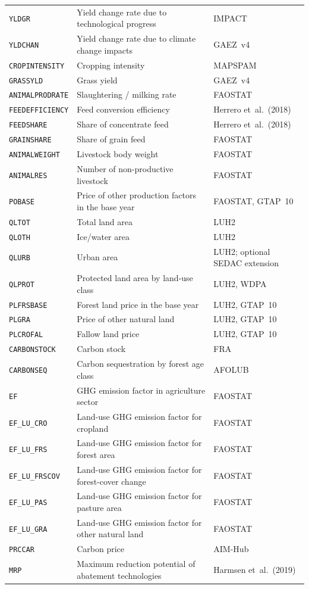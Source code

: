 \begin{xltabular}{\linewidth}{l X l}
  \texttt{YLDGR} & Yield change rate due to technological progress & IMPACT \\
  \texttt{YLDCHAN} & Yield change rate due to climate change impacts & GAEZ~v4 \\
  \texttt{CROPINTENSITY} & Cropping intensity & MAPSPAM \\
  \texttt{GRASSYLD} & Grass yield & GAEZ~v4 \\
  \texttt{ANIMALPRODRATE} & Slaughtering / milking rate & FAOSTAT \\
  \texttt{FEEDEFFICIENCY} & Feed conversion efficiency & Herrero et~al.~(2018) \\
  \texttt{FEEDSHARE} & Share of concentrate feed & Herrero et~al.~(2018) \\
  \texttt{GRAINSHARE} & Share of grain feed & FAOSTAT \\
  \texttt{ANIMALWEIGHT} & Livestock body weight & FAOSTAT \\
  \texttt{ANIMALRES} & Number of non-productive livestock & FAOSTAT \\
  \texttt{POBASE} & Price of other production factors in the base year & FAOSTAT, GTAP~10 \\
  \texttt{QLTOT} & Total land area & LUH2 \\
  \texttt{QLOTH} & Ice/water area & LUH2 \\
  \texttt{QLURB} & Urban area & LUH2; optional SEDAC extension \\
  \texttt{QLPROT} & Protected land area by land-use class & LUH2, WDPA \\
  \texttt{PLFRSBASE} & Forest land price in the base year & LUH2, GTAP~10 \\
  \texttt{PLGRA} & Price of other natural land & LUH2, GTAP~10 \\
  \texttt{PLCROFAL} & Fallow land price & LUH2, GTAP~10 \\
  \texttt{CARBONSTOCK} & Carbon stock & FRA~\cite{FAO2020FRA} \\
  \texttt{CARBONSEQ} & Carbon sequestration by forest age class & AFOLUB~\cite{hasegawaNationalLandbasedClimate2025} \\
  \texttt{EF} & GHG emission factor in agriculture sector & FAOSTAT \\
  \texttt{EF\_LU\_CRO} & Land-use GHG emission factor for cropland & FAOSTAT \\
  \texttt{EF\_LU\_FRS} & Land-use GHG emission factor for forest area & FAOSTAT \\
  \texttt{EF\_LU\_FRSCOV} & Land-use GHG emission factor for forest-cover change & FAOSTAT \\
  \texttt{EF\_LU\_PAS} & Land-use GHG emission factor for pasture area & FAOSTAT \\
  \texttt{EF\_LU\_GRA} & Land-use GHG emission factor for other natural land & FAOSTAT \\
  \texttt{PRCCAR} & Carbon price & AIM-Hub \\
  \texttt{MRP} & Maximum reduction potential of abatement technologies & Harmsen et~al.~(2019) \\
\end{xltabular}





